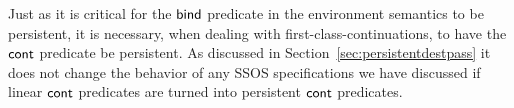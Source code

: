 Just as it is critical for the ${\sf bind}$ predicate in the
environment semantics to be persistent, it is necessary, when dealing
with first-class-continuations, to have the ${\sf cont}$ predicate be
persistent. As discussed in Section~\ref{sec:persistentdestpass} it
does not change the behavior of any SSOS specifications we have
discussed if linear ${\sf cont}$ predicates are turned into persistent
${\sf cont}$ predicates.
